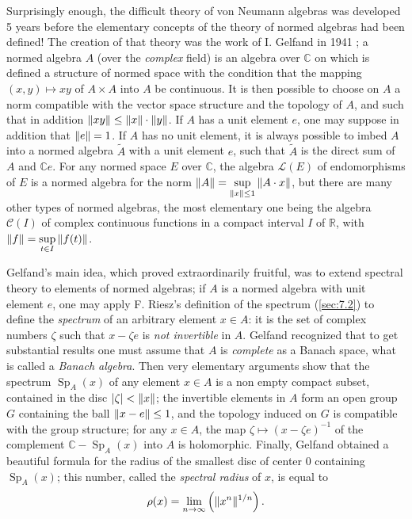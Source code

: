 \documentclass[12pt,a4paper,leqno,twoside]{extbook}
\DeclarePairedDelimiter{\norm}{\lVert}{\rVert}
\newcommand{\Cont}{\mathcal{C}}
\newcommand{\C}{\mathbb{C}}
\newcommand{\R}{\mathbb{R}}
\newcommand{\spec}{\operatorname{Sp}}
\begin{document}
Surprisingly enough, the difficult theory of von Neumann algebras was developed 5 years before the elementary concepts of the theory of normed algebras had been defined! The creation of that theory was the work of I. Gelfand in 1941 \cite{083}; a normed algebra \(A\) (over the \emph{complex} field) is an algebra over \(\C\) on which is defined a structure of normed space with the condition that the mapping \((x,y) \mapsto xy\) of \(A \times A\) into \(A\) be continuous. It is then possible to choose on \(A\) a norm compatible with the vector space structure and the topology of \(A\), and such that in addition \(\norm{xy} \leq \norm{x} \cdot \norm{y}\). If \(A\) has a unit element \(e\), one may suppose in addition that \(\norm{e} = 1\). If \(A\) has no unit element, it is always possible to imbed \(A\) into a normed algebra \(\tilde{A}\) with a unit element \(e\), such that \(\tilde{A}\) is the direct sum of \(A\) and \(\C e\). For any normed space \(E\) over \(\C\), the algebra \(\mathcal{L}(E)\) of endomorphisms of \(E\) is a normed algebra for the norm \(\norm{A} = \sup\limits_{\norm{x} \leq 1}{\norm{A \cdot x}}\), but there are many other types of normed algebras, the most elementary one being the algebra \(\Cont(I)\) of complex continuous functions in a compact interval \(I\) of \(\R\), with \(\norm{f} = \sup\limits_{t \in I}{\norm{f(t)}}\).

Gelfand's main idea, which proved extraordinarily fruitful, was to extend spectral theory to elements of normed algebras; if \(A\) is a normed algebra with unit element \(e\), one may apply F. Riesz's definition of the spectrum (\ref{sec:7.2}) to define the \emph{spectrum} of an arbitrary element \(x \in A\): it is the set of complex numbers \(\zeta\) such that \(x - \zeta e\) is \emph{not invertible} in \(A\). Gelfand recognized that to get substantial results one must assume that \(A\) is \emph{complete} as a Banach space, what is called a \emph{Banach algebra}. Then very elementary arguments show that the spectrum \(\spec_A(x)\) of any element \(x \in A\) is a non empty compact subset, contained in the disc \(|\zeta| < \norm{x}\); the invertible elements in \(A\) form an open group \(G\) containing the ball \(\norm{x - e} \leq 1\), and the topology induced on \(G\) is compatible with the group structure; for any \(x \in A\), the map \(\zeta \mapsto (x - \zeta e)^{-1}\) of the complement \(\C - \spec_A(x)\) into \(A\) is holomorphic. Finally, Gelfand obtained a beautiful formula for the radius of the smallest disc of center 0 containing \(\spec_A(x)\); this number, called the \emph{spectral radius} of \(x\), is equal to
\begin{equation}
    \label{eq:7.39}
    \rho(x) = \lim_{n \to \infty} \left( \norm{x^n}^{1/n} \right).
\end{equation}
\end{document}
